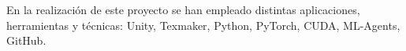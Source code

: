 
En la realización de este proyecto se han empleado distintas aplicaciones, herramientas y técnicas: Unity, Texmaker, Python, PyTorch, CUDA, ML-Agents, GitHub.




